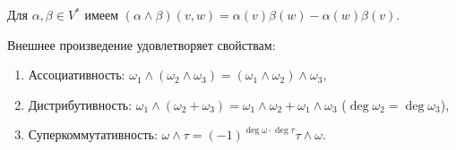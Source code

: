 \begin{example}
	Для $\alpha, \beta \in V^*$ имеем $(\alpha \wedge \beta)(v, w) = \alpha(v) \beta(w) - \alpha(w)\beta(v)$.
\end{example}

\begin{lemma}
	Внешнее произведение удовлетворяет свойствам:
	\begin{enumerate}[itemsep = 0pt, topsep = 5pt]
		\item Ассоциативность: $\omega_1 \wedge (\omega_2 \wedge \omega_3) = (\omega_1 \wedge \omega_2) \wedge \omega_3$,
		\item Дистрибутивность: $\omega_1 \wedge (\omega_2 + \omega_3) = \omega_1 \wedge \omega_2 + \omega_1 \wedge \omega_3$ ($\deg \omega_2 = \deg \omega_3$), 
		\item Суперкоммутативность: $\omega \wedge \tau = (-1)^{\deg \omega \cdot \deg \tau}  \tau \wedge \omega$.
	\end{enumerate}
\end{lemma}

